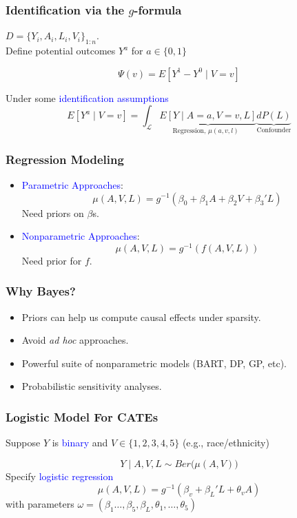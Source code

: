\documentclass[xcolor=x11names,compress]{beamer}
\renewcommand{\(}{\begin{columns}}
\renewcommand{\)}{\end{columns}}
\newcommand{\<}[1]{\begin{column}{#1}}
\renewcommand{\>}{\end{column}}
\begin{document}
\begin{frame}
	\frametitle{Identification via the $g$-formula}
	$D = \{Y_i, A_i, L_i, V_i \}_{1:n}$. \\ 
	Define potential outcomes $Y^a$ for $a\in\{0,1\}$
	
	\pause
	$$\Psi(v) =  E[ Y^1 - Y^0 \mid V=v ]$$
	
	\pause 
	Under some \textcolor{blue}{identification assumptions}
	$$ E[Y^a \mid V=v] = \int_{\mathcal{L}} \underbrace{E[ Y\mid A=a, V=v, L ]}_{\text{Regression, $\mu(a, v, l)$ }} \underbrace{dP(L)}_{ \text{Confounder} }  $$
\end{frame}

\begin{frame}
	\frametitle{Regression Modeling}

\begin{itemize}
	\item	\textcolor{blue}{Parametric Approaches}:
	$$ \mu(A, V, L) = g^{-1}( \beta_0 +  \beta_1 A + \beta_2 V + \beta_3' L ) $$
	Need priors on $\beta$s.
	
	\item \textcolor{blue}{Nonparametric Approaches}:
	$$ \mu(A, V, L) = g^{-1}( f(A, V,  L)   ) $$	
	Need prior for $f$.
\end{itemize}
	
\end{frame}

\begin{frame}
	\frametitle{Why Bayes?}
	
	\begin{itemize}
		\item Priors can help us compute causal effects under sparsity.
		\item Avoid \textit{ad hoc} approaches.
		\item Powerful suite of nonparametric models (BART, DP, GP, etc).
		\item Probabilistic sensitivity analyses.
	\end{itemize}
\end{frame}

\begin{frame}
	\frametitle{Logistic Model For CATEs}
	Suppose $Y$ is \textcolor{blue}{binary} and $V\in\{1,2,3,4,5 \} $ (e.g., race/ethnicity)
	
	$$ Y \mid A, V, L \sim Ber \big( \mu(A, V) \big) $$
	\pause
	Specify \textcolor{blue}{logistic regression}
	$$ \mu(A, V, L) = g^{-1}( \beta_v + \beta_L' L +  \theta_v A ) $$
	with parameters $\omega = ( \beta_1\dots, \beta_5, \beta_L, \theta_1, \dots,\theta_5 )$ 
\end{frame}
\end{document}
